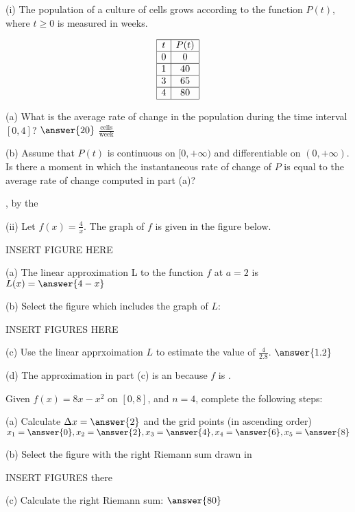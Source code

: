 \documentclass{ximera}
\begin{document}
\begin{exercise}
(i) The population of a culture of cells grows according to the function $P(t)$, where $t\geq 0$ is measured in weeks.

\[
\begin{array}{|c|c|}\hline
t & P(t) \\ \hline
0 & 0 \\ \hline
1 & 40 \\ \hline
3 & 65 \\ \hline
4 & 80 \\ \hline
\end{array}
\]

(a) What is the average rate of change in the population during the time interval $[0,4]$? $\answer{20}$ $\frac{\text{cells}}{\text{week}}$

(b) Assume that $P(t)$ is continuous on $[0,+\infty)$ and differentiable on $(0,+\infty)$. Is there a moment in which the instantaneous rate of change of $P$ is equal to the average rate of change computed in part (a)? \begin{multipleChoice}\end{multipleChoice}, by the \begin{multipleChoice}\end{multipleChoice}

(ii) Let $f(x)=\frac{4}{x}$. The graph of $f$ is given in the figure below.

INSERT FIGURE HERE

(a) The linear approximation L to the function $f$ at $a=2$ is $L(x)=\answer{4-x}$

(b) Select the figure which includes the graph of $L$:

INSERT FIGURES HERE

(c) Use the linear apprxoimation $L$ to estimate the value of $\frac{4}{2.8}$. $\answer{1.2}$

(d) The approximation in part (c) is an  because $f$ is .
\end{exercise}

\begin{exercise}
Given $f(x)=8x-x^2$ on $[0,8]$, and $n=4$, complete the following steps:

(a) Calculate $\Delta x=\answer{2}$ and the grid points (in ascending order) $x_1=\answer{0}, x_2=\answer{2}, x_3=\answer{4}, x_4=\answer{6}, x_5=\answer{8}$

(b) Select the figure with the right Riemann sum drawn in

INSERT FIGURES there

(c) Calculate the right Riemann sum: $\answer{80}$

\end{exercise}
\end{document}
